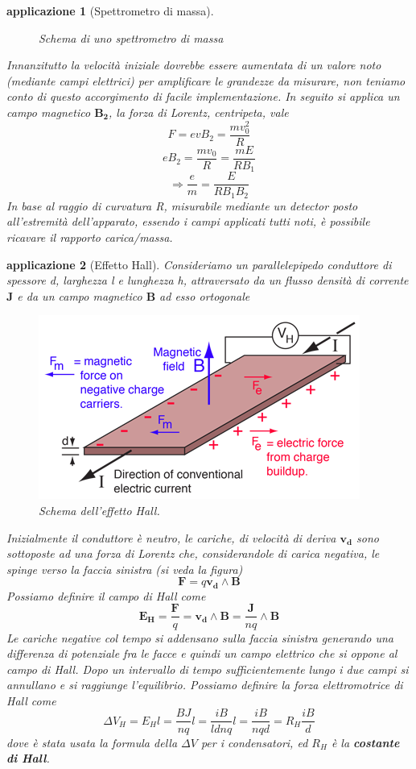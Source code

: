 \documentclass[10pt,a4paper]{article}
\newtheorem{applicazione}{applicazione}
\begin{document}
\begin{applicazione}[Spettrometro di massa]
\begin{figure}[h!]
	\caption{Schema di uno spettrometro di massa}
	\label{fig:spettrometro}
\end{figure}
\FloatBarrier
Innanzitutto la velocità iniziale dovrebbe essere aumentata di un valore noto (mediante campi elettrici) per amplificare le grandezze da misurare, non teniamo conto di questo accorgimento di facile implementazione. In seguito si applica un campo magnetico $\mathbf{B_2}$, la forza di Lorentz, centripeta, vale
\[F = evB_2= \frac{mv_0^2}{R}\]
\[eB_2 = \frac{mv_0}{R}= \frac{mE}{RB_1} \]
\[\Rightarrow \frac{e}{m}= \frac{E}{RB_1B_2}\]
In base al raggio di curvatura R, misurabile mediante un detector posto all'estremità dell'apparato, essendo i campi applicati tutti noti, è possibile ricavare il rapporto carica/massa.
\end{applicazione}
\begin{applicazione}[Effetto Hall]
	Consideriamo un parallelepipedo conduttore di spessore d, larghezza l e lunghezza h, attraversato da un flusso densità di corrente $\mathbf{J}$ e da un campo magnetico \(\mathbf{B}\) ad esso ortogonale
\begin{figure}[h!]
	\centering
	\includegraphics[width=0.6\linewidth]{images/hall_effect}
	\caption{Schema dell'effetto Hall.}
	\label{fig:halleffect}
\end{figure}
\FloatBarrier
Inizialmente il conduttore è neutro, le cariche, di velocità di deriva $\mathbf{v_d}$ sono sottoposte ad una forza di Lorentz che, considerandole di carica negativa, le spinge verso la faccia sinistra (si veda la figura)
\[\mathbf{F}= q\mathbf{v_d}\wedge\mathbf{B}\] 
Possiamo definire il campo di Hall come
\[\mathbf{E_H}=\frac{\mathbf{F}}{q}=\mathbf{v_d}\wedge\mathbf{B}=\frac{\mathbf{J}}{nq}\wedge\mathbf{B}\]
Le cariche negative col tempo si addensano sulla faccia sinistra generando una differenza di potenziale fra le facce e quindi un campo elettrico che si oppone al campo di Hall. Dopo un intervallo di tempo sufficientemente lungo i due campi si annullano e si raggiunge l'equilibrio. Possiamo definire la forza elettromotrice di Hall come
\[\Delta V_H = E_H l =\frac{BJ}{nq}l =\frac{iB}{ldnq}l=\frac{i B}{nqd} = R_H \frac{iB}{d}\] 
dove è stata usata la formula della \(\Delta V\) per i condensatori, ed \(R_H\) è la \textbf{costante di Hall}.
\end{applicazione}
\end{document}
